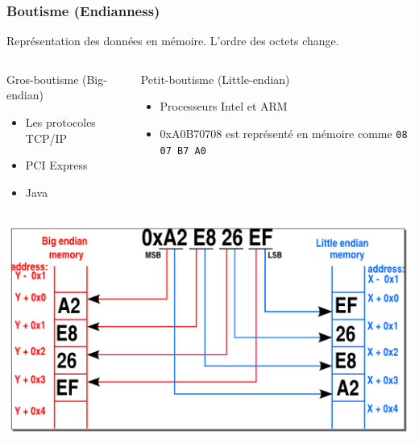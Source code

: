 \documentclass[10pt,xcolor={table,dvipsnames},t]{beamer}
\begin{document}
\begin{frame}
    \frametitle{Boutisme (Endianness)}
    Représentation des données en mémoire. L'ordre des octets change.
    \begin{columns}[T]
        \begin{column}{0.48\textwidth}
            Gros-boutisme (Big-endian)
            \begin{itemize}
                \item Les protocoles TCP/IP 
                \item PCI Express
                \item Java
            \end{itemize}
        \end{column}
        
        \begin{column}{0.48\textwidth}
            Petit-boutisme (Little-endian)
            \begin{itemize}
                \item Processeurs Intel et ARM
                \item 0xA0B70708 est représenté en mémoire comme \texttt{08 07 B7 A0}
            \end{itemize}
        \end{column}
    \end{columns}
    
    \begin{center}
    \includegraphics[width=.56\textwidth,height=.4\textheight]{Page-2-Image-3.png}%
    \end{center}
\end{frame}


\end{document}
